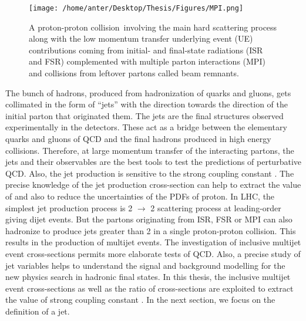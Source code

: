 \begin{figure}[!h]
\begin{center}
\hspace*{-7mm}
\texttt{[image: /home/anter/Desktop/Thesis/Figures/MPI.png]}\\
\vspace*{4mm}
\caption[Proton-proton collision.]{A proton-proton collision\footnotemark~involving the main hard scattering process along with the low momentum transfer underlying event (UE) contributions coming from initial- and final-state radiations (ISR and FSR) complemented with multiple parton interactions (MPI) and collisions from leftover partons called beam remnants.}
\label{fig:MPI}
\end{center}
\end{figure}
The bunch of hadrons, produced from hadronization of quarks and gluons, gets collimated in the form of ``jets'' with the direction towards the direction of the initial parton that originated them. The jets are the final structures observed experimentally in the detectors. These act as a bridge between the elementary quarks and gluons of QCD and the final hadrons produced in high energy collisions. Therefore, at large momentum transfer of the interacting partons, the jets and their observables are the best tools to test the predictions of perturbative QCD. Also, the jet production is sensitive to the strong coupling constant \alpsns. The precise knowledge of the jet production cross-section can help to extract the value of \alps and also to reduce the uncertainties of the PDFs of proton. In LHC, the simplest jet production process is 2 $\rightarrow$ 2 scattering process at leading-order giving dijet events. But the partons originating from ISR, FSR or MPI can also hadronize to produce jets greater than 2 in a single proton-proton collision. This results in the production of multijet events. The investigation of inclusive multijet event cross-sections permits more elaborate tests of QCD. Also, a precise study of jet variables helps to understand the signal and background modelling for the new physics search in hadronic final states. In this thesis, the inclusive multijet event cross-sections as well as the ratio of cross-sections are exploited to extract the value of strong coupling constant \alps. In the next section, we focus on the definition of a jet.

